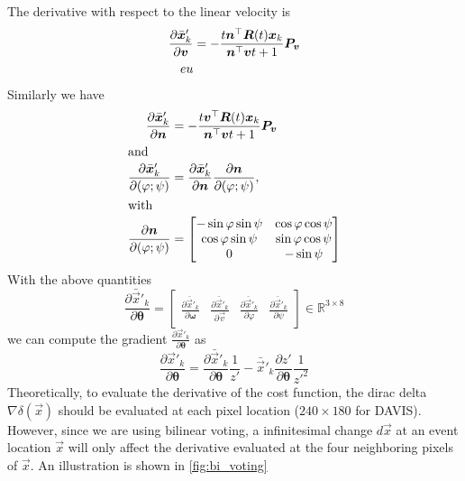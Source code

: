 The derivative with respect to the linear velocity is
\begin{align}
  \frac{\partial\bar{\vec{x}}'_k}{\partial\vec{v}}&=-\frac{t\vec{n}^\top\mat{R}(t)\vec{x}_k}{\vec{n}^\top\vec{v}t+1}\mat{P_v} \label{eq:dxdv}\\
  eu
\end{align}
Similarly we have
\begin{align}
  \frac{\partial\bar{\vec{x}}'_k}{\partial\vec{n}}&=-\frac{t\vec{v}^\top\mat{R}(t)\vec{x}_k}{\vec{n}^\top\vec{v}t+1}\mat{P_v} \\
  \intertext{and}
  \frac{\partial\bar{\vec{x}}'_k}{\partial(\varphi;\psi)}&= \frac{\partial\bar{\vec{x}}'_k}{\partial\vec{n}}\frac{\partial\vec{n}}{\partial(\varphi;\psi)},\\
  \intertext{with}
  \frac{\partial\vec{n}}{\partial(\varphi;\psi)}&=
                                                  \begin{bmatrix}
                                                    -\sin\varphi\sin\psi&\cos\varphi\cos\psi\\
                                                    \cos\varphi\sin\psi&\sin\varphi\cos\psi\\
                                                    0&-\sin\psi
                                                  \end{bmatrix}
                                                       \label{eq:dvdn}
\end{align}
With the above quantities
\begin{equation*}
  \label{eq:dx_dtheta}
  \frac{\partial\bar{\vec{x}}'_k}{\partial\bm{\theta}}=
  \begin{bmatrix}
    \frac{\partial\bar{\vec{x}}'_k}{\partial\bm{\omega}}&
    \frac{\partial\bar{\vec{x}}'_k}{\partial\vec{v}}&
    \frac{\partial\bar{\vec{x}}'_k}{\partial\varphi}&\frac{\partial\bar{\vec{x}}'_k}{\partial\psi}
  \end{bmatrix}\in\mathbb{R}^{3\times8}
\end{equation*}
we can compute the gradient
$\frac{\partial\vec{x}'_k}{\partial\bm{\theta}}$ as
\begin{equation}
  \label{eq:dxdtheta}
  \frac{\partial\vec{x}'_k}{\partial\bm{\theta}}=\frac{\partial\bar{\vec{x}}'_k}{\partial\bm{\theta}}\frac{1}{z'}-\bar{\vec{x}}'_k\frac{\partial z'}{\partial\bm{\theta}}\frac{1}{z'^2}
\end{equation}
Theoretically, to evaluate the derivative of the cost function, the
dirac delta $\nabla\delta(\vec{x})$ should be evaluated at each pixel
location ($240\times180$ for DAVIS). However, since we are using
bilinear voting, a infinitesimal change $d\vec{x}$ at an event
location $\vec{x}$ will only affect the derivative evaluated at the
four neighboring pixels of $\vec{x}$. An illustration is shown in
\cref{fig:bi_voting}


